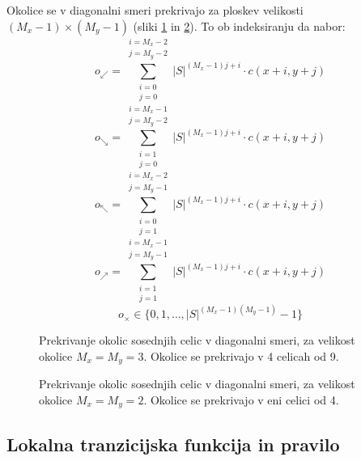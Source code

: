 \documentclass[12pt,a4paper,openany,twoside]{book}
\begin{document}
Okolice se v diagonalni smeri prekrivajo za ploskev velikosti \((M_x-1) \times (M_y-1)\) (sliki \ref{overlap_diagonal_moore} in \ref{overlap_diagonal_quad}).
To ob indeksiranju da nabor:
\begin{equation}
o_{\swarrow} = \sum_{\substack{i=0 \\ j=0}}^{\substack{i=M_x-2 \\ j=M_y-2}} |S|^{(M_x-1) j + i} \cdot c(x+i,y+j)
\end{equation}
\begin{equation}
o_{\searrow} = \sum_{\substack{i=1 \\ j=0}}^{\substack{i=M_x-1 \\ j=M_y-2}} |S|^{(M_x-1) j + i} \cdot c(x+i,y+j)
\end{equation}
\begin{equation}
o_{\nwarrow} = \sum_{\substack{i=0 \\ j=1}}^{\substack{i=M_x-2 \\ j=M_y-1}} |S|^{(M_x-1) j + i} \cdot c(x+i,y+j)
\end{equation}
\begin{equation}
o_{\nearrow} = \sum_{\substack{i=1 \\ j=1}}^{\substack{i=M_x-1 \\ j=M_y-1}} |S|^{(M_x-1) j + i} \cdot c(x+i,y+j)
\end{equation}
\begin{equation}
o_{\times} \in \{0, 1, \ldots, |S|^{(M_x-1)(M_y-1)}-1\}
\end{equation}

\begin{figure}[htb]
\centerline{}
\caption[Prekrivanje okolic \(3 \times 3\) - diagonalno.]
{Prekrivanje okolic sosednjih celic v diagonalni smeri, za velikost okolice \(M_x=M_y=3\).
Okolice se prekrivajo v 4 celicah od 9.}
\label{overlap_diagonal_moore}
\end{figure}

\begin{figure}[htb]
\centerline{}
\caption[Prekrivanje okolic \(2 \times 2\) - diagonalno.]
{Prekrivanje okolic sosednjih celic v diagonalni smeri, za velikost okolice \(M_x=M_y=2\).
Okolice se prekrivajo v eni celici od 4.}
\label{overlap_diagonal_quad}
\end{figure}

\subsection{Lokalna tranzicijska funkcija in pravilo}
\end{document}

